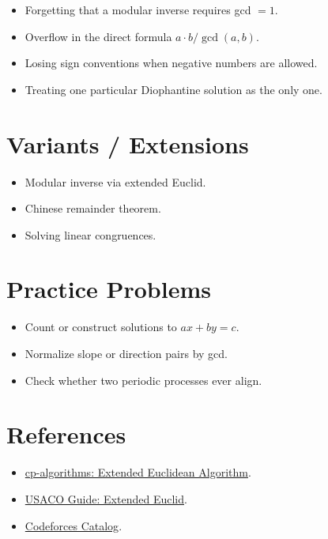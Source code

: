 \begin{itemize}
  \item Forgetting that a modular inverse requires gcd \(= 1\).
  \item Overflow in the direct formula \(a \cdot b / \gcd(a,b)\).
  \item Losing sign conventions when negative numbers are allowed.
  \item Treating one particular Diophantine solution as the only one.
\end{itemize}

\section*{Variants / Extensions}

\begin{itemize}
  \item Modular inverse via extended Euclid.
  \item Chinese remainder theorem.
  \item Solving linear congruences.
\end{itemize}

\section*{Practice Problems}

\begin{itemize}
  \item Count or construct solutions to \(ax + by = c\).
  \item Normalize slope or direction pairs by gcd.
  \item Check whether two periodic processes ever align.
\end{itemize}

\section*{References}

\begin{itemize}
  \item \href{https://cp-algorithms.com/algebra/extended-euclid-algorithm.html}{cp-algorithms: Extended Euclidean Algorithm}.
  \item \href{https://usaco.guide/adv/extend-euclid?lang=cpp}{USACO Guide: Extended Euclid}.
  \item \href{https://codeforces.com/catalog}{Codeforces Catalog}.
\end{itemize}
